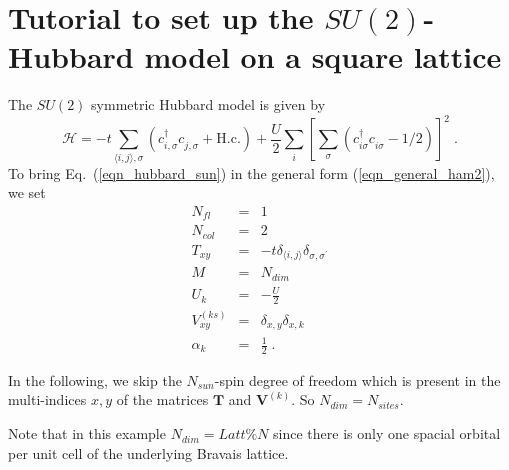 \section{Tutorial to set up the $SU(2)$-Hubbard model on a square lattice}
The $SU(2)$ symmetric Hubbard model is given by
\begin{equation}
\label{eqn_hubbard_sun}
\mathcal{H}=
-t\sum\limits_{\langle i,j\rangle,\sigma} 
\left(c^{\dagger}_{i,\sigma} c^{\phantom\dagger}_{j,\sigma} + \text{H.c.}
\right)
+ \frac{U}{2}\sum\limits_{i}\left[
\sum\limits_{\sigma}
\left(  c^{\dagger}_{i\sigma} c^{\phantom\dagger}_{i\sigma}  -1/2 \right) \right]^{2}\;.
\end{equation}
To bring Eq.~(\ref{eqn_hubbard_sun}) in the general form (\ref{eqn_general_ham2}), we set
\begin{eqnarray}
N_{fl}         &=&  1 \nonumber\\
N_{col}        &=&  2 \nonumber\\
T_{x y}        &=&  -t\delta_{\langle i,j\rangle}\delta_{\sigma,\sigma^{\prime}} \nonumber\\
M              &=&  N_{dim} \nonumber\\
U_{k}          &=&  -\frac{U}{2} \nonumber\\
V_{x y}^{(ks)} &=&  \delta_{x,y}\delta_{x,k} \nonumber\\
\alpha_{k}     &=&  \frac{1}{2} \;.
\end{eqnarray}

In the following, we skip the $N_{sun}$-spin degree of freedom which is present in the multi-indices $x,y$ of the matrices $\bm{T}$ and ${\bm V}^{(k)}$. 
So $N_{dim}=N_{sites}$. 


Note that in this example $N_{dim}=Latt\%N$ since there is only one spacial orbital per unit cell of the underlying Bravais lattice.

